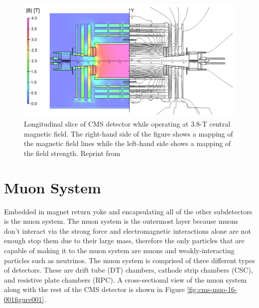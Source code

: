 \begin{figure}[h]
	\centering
	\includegraphics[width=0.9\linewidth]{Figures/Solenoidmagnet}
	\caption{Longitudinal slice of CMS detector while operating at 3.8-T central magnetic field. The right-hand side of the figure shows a mapping of the magnetic field lines while the left-hand side shows a mapping of the field strength. Reprint from \cite{Chatrchyan:2009si}}
	\label{fig:solenoidmagnet}
\end{figure}




\section{Muon System}
Embedded in magnet return yoke and encapsulating all of the other subdetectors is the muon system.  The muon system is the outermost layer because muons don't interact via the strong force and electromagnetic interactions alone are not enough stop them due to their large mass, therefore the only particles that are capable of making it to the muon system are muons and weakly-interacting particles such as neutrinos.  The muon system is comprised of three different types of detectors.  These are drift tube (DT) chambers, cathode strip chambers (CSC), and resistive plate chambers (RPC).  A cross-sectional view of the muon system along with the rest of the CMS detector is shown in Figure \ref{fig:cms-muo-16-001figure001}.

